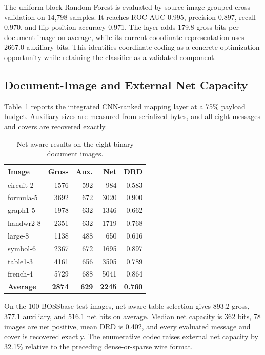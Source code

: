 \documentclass[a4paper,fleqn]{cas-dc}
\begin{document}
The uniform-block Random Forest is evaluated by source-image-grouped
cross-validation on 14,798 samples. It reaches ROC AUC 0.995, precision 0.897,
recall 0.970, and flip-position accuracy 0.971. The layer adds 179.8 gross bits
per document image on average, while its current coordinate representation
uses 2667.0 auxiliary bits. This identifies coordinate coding as a concrete
optimization opportunity while retaining the classifier as a validated
component.

\subsection{Document-Image and External Net Capacity}

Table~\ref{tab:document-net} reports the integrated CNN-ranked mapping layer at
a 75\% payload budget. Auxiliary sizes are measured from serialized bytes, and
all eight messages and covers are recovered exactly.

\begin{table}[t]
\centering
\caption{Net-aware results on the eight binary document images.}
\label{tab:document-net}
\begin{tabular}{@{}lrrrr@{}}
\toprule
\textbf{Image} & \textbf{Gross} & \textbf{Aux.} & \textbf{Net} & \textbf{DRD} \\
\midrule
circuit-2 & 1576 & 592 & 984 & 0.583 \\
formula-5 & 3692 & 672 & 3020 & 0.900 \\
graph1-5 & 1978 & 632 & 1346 & 0.662 \\
handwr2-8 & 2351 & 632 & 1719 & 0.768 \\
large-8 & 1138 & 488 & 650 & 0.616 \\
symbol-6 & 2367 & 672 & 1695 & 0.897 \\
table1-3 & 4161 & 656 & 3505 & 0.789 \\
french-4 & 5729 & 688 & 5041 & 0.864 \\
\midrule
\textbf{Average} & \textbf{2874} & \textbf{629} & \textbf{2245} & \textbf{0.760} \\
\bottomrule
\end{tabular}
\end{table}

On the 100 BOSSbase test images, net-aware table selection gives 893.2 gross,
377.1 auxiliary, and 516.1 net bits on average. Median net capacity is 362
bits, 78 images are net positive, mean DRD is 0.402, and every evaluated
message and cover is recovered exactly. The enumerative codec raises external
net capacity by 32.1\% relative to the preceding dense-or-sparse wire format.
\end{document}
